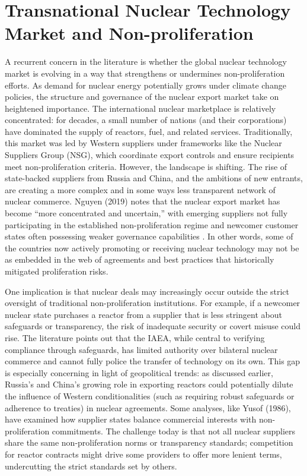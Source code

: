 \documentclass[11,5 pt]{article}
\begin{document}
\section{Transnational Nuclear Technology Market and Non-proliferation}


A recurrent concern in the literature is whether the global nuclear technology market is evolving in a way that strengthens or undermines non-proliferation efforts. As demand for nuclear energy potentially grows under climate change policies, the structure and governance of the nuclear export market take on heightened importance. The international nuclear marketplace is relatively concentrated: for decades, a small number of nations (and their corporations) have dominated the supply of reactors, fuel, and related services. Traditionally, this market was led by Western suppliers under frameworks like the Nuclear Suppliers Group (NSG), which coordinate export controls and ensure recipients meet non-proliferation criteria. However, the landscape is shifting. The rise of state-backed suppliers from Russia and China, and the ambitions of new entrants, are creating a more complex and in some ways less transparent network of nuclear commerce. Nguyen (2019) notes that the nuclear export market has become “more concentrated and uncertain,” with emerging suppliers not fully participating in the established non-proliferation regime and newcomer customer states often possessing weaker governance capabilities \cite{Nguyen}. In other words, some of the countries now actively promoting or receiving nuclear technology may not be as embedded in the web of agreements and best practices that historically mitigated proliferation risks.

One implication is that nuclear deals may increasingly occur outside the strict oversight of traditional non-proliferation institutions. For example, if a newcomer nuclear state purchases a reactor from a supplier that is less stringent about safeguards or transparency, the risk of inadequate security or covert misuse could rise. The literature points out that the IAEA, while central to verifying compliance through safeguards, has limited authority over bilateral nuclear commerce and cannot fully police the transfer of technology on its own. This gap is especially concerning in light of geopolitical trends: as discussed earlier, Russia’s and China’s growing role in exporting reactors could potentially dilute the influence of Western conditionalities (such as requiring robust safeguards or adherence to treaties) in nuclear agreements. Some analyses, like Yusof (1986), have examined how supplier states balance commercial interests with non-proliferation commitments. The challenge today is that not all nuclear suppliers share the same non-proliferation norms or transparency standards; competition for reactor contracts might drive some providers to offer more lenient terms, undercutting the strict standards set by others.
\end{document}
